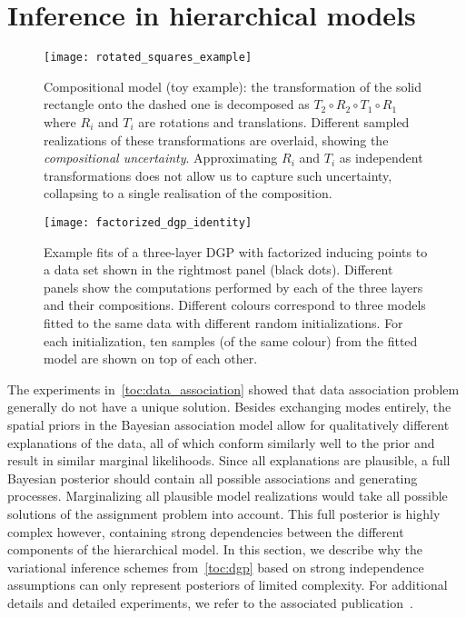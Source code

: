 \section{Inference in hierarchical models}
\label{toc:discussion:composition}
\begin{figure}[t]
    \centering
    \texttt{[image: rotated\_squares\_example]}
    \caption{
        \label{fig:composition:rotated_squares_example}
        Compositional model (toy example): the transformation of the solid rectangle onto the dashed one is decomposed as $T_2 \circ R_2 \circ T_1 \circ R_1$ where $R_i$ and $T_i$ are rotations and translations.
        Different sampled realizations of these transformations are overlaid, showing the \emph{compositional uncertainty}.
        Approximating $R_i$ and $T_i$ as independent transformations does not allow us to capture such uncertainty, collapsing to a single realisation of the composition.
    }
\end{figure}
\begin{figure}[t]
    \centering
    \texttt{[image: factorized\_dgp\_identity]}
    \caption{
        \label{fig:composition:identity_factorised}
        Example fits of a three-layer DGP with factorized inducing points to a data set shown in the rightmost panel (black dots).
        Different panels show the computations performed by each of the three layers and their compositions.
        Different colours correspond to three models fitted to the same data with different random initializations.
        For each initialization, ten samples (of the same colour) from the fitted model are shown on top of each other.
    }
\end{figure}
The experiments in~\cref{toc:data_association} showed that data association problem generally do not have a unique solution.
Besides exchanging modes entirely, the spatial priors in the Bayesian association model allow for qualitatively different explanations of the data, all of which conform similarly well to the prior and result in similar marginal likelihoods.
Since all explanations are plausible, a full Bayesian posterior should contain all possible associations and generating processes.
Marginalizing all plausible model realizations would take all possible solutions of the assignment problem into account.
This full posterior is highly complex however, containing strong dependencies between the different components of the hierarchical model.
In this section, we describe why the variational inference schemes from~\cref{toc:dgp} based on strong independence assumptions can only represent posteriors of limited complexity.
For additional details and detailed experiments, we refer to the associated publication~\parencite{ustyuzhaninov_compositional_2020}.

